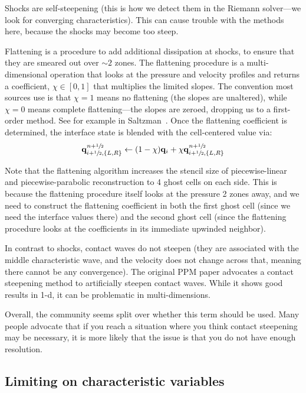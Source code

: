  Shocks are self-steepening (this is how we
  detect them in the Riemann solver---we look for converging characteristics).
  This can cause trouble with the methods here, because the shocks may become
  too steep.

  Flattening is a procedure to add additional dissipation at shocks,
  to ensure that they are smeared out over $\sim 2$ zones.  The
  flattening procedure is a multi-dimensional operation that looks at
  the pressure and velocity profiles and returns a coefficient, $\chi
  \in [0,1]$ that multiplies the limited slopes.  The convention most
  sources use is that $\chi = 1$ means no flattening (the slopes are
  unaltered), while $\chi = 0$ means complete flattening---the slopes
  are zeroed, dropping us to a first-order method.
  See for example in Saltzman~\cite{saltzman:1994}.  Once the flattening
  coefficient is determined, the interface state is blended with the
  cell-centered value via:
  \begin{equation}
  {\bf q}_{i+{\sfrac{1}{2}},\{L,R\}}^{n+{\sfrac{1}{2}}} \leftarrow (1 - \chi) {\bf q}_i + \chi {\bf q}_{i+{\sfrac{1}{2}},\{L,R\}}^{n+{\sfrac{1}{2}}}
  \end{equation}

  Note that the flattening algorithm increases the stencil size of
  piecewise-linear and piecewise-parabolic reconstruction to 4 ghost cells
  on each side.  This is because the flattening procedure itself looks
  at the pressure 2 zones away, and we need to construct the flattening
  coefficient in both the first ghost cell (since we need the interface
  values there) and the second ghost cell (since the flattening procedure
  looks at the coefficients in its immediate upwinded neighbor).

  In contrast to shocks, contact waves
  do not steepen (they are associated with the middle characteristic
  wave, and the velocity does not change across that, meaning there
  cannot be any convergence).  The original PPM
  paper advocates a contact steepening method to artificially steepen
  contact waves.  While it shows good results in 1-d, it can be
  problematic in multi-dimensions.

  Overall, the community seems split over whether this term should be
  used.  Many people advocate that if you reach a situation where you
  think contact steepening may be necessary, it is more likely that
  the issue is that you do not have enough resolution.


\subsection{Limiting on characteristic variables}

